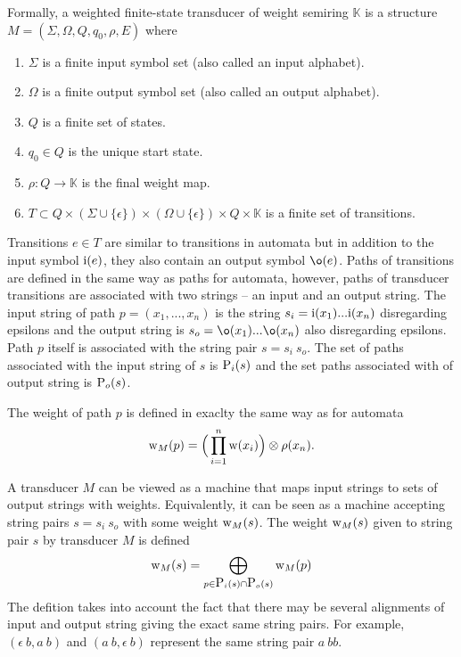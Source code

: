 Formally, a weighted finite-state transducer of weight semiring
$\mathbb{K}$ is a structure $M = (\Sigma, \Omega, Q, q_0, \rho, E)$ where
\begin{enumerate}
\item $\Sigma$ is a finite input symbol set (also called an input alphabet).
\item $\Omega$ is a finite output symbol set (also called an output alphabet).
\item $Q$ is a finite set of states.
\item $q_0 \in Q$ is the unique start state.
\item $\rho: Q \rightarrow \mathbb{K}$ is the final weight map.
\item $T \subset Q \times (\Sigma \cup \{\epsilon\}) \times (\Omega \cup \{\epsilon\}) \times Q \times
\mathbb{K} $ is a finite set of transitions.
\end{enumerate}

Transitions $e \in T$ are similar to transitions in automata but in
addition to the input symbol $\i(e)$, they also contain an output
symbol $\o(e)$. Paths of transitions are defined in the same way as
paths for automata, however, paths of transducer transitions are
associated with two strings -- an input and an output string. The
input string of path $p = (x_1, ..., x_n)$ is the string $s_i =
\i(x_1) ... \i(x_n)$ disregarding epsilons and the output string is
$s_o = \o(x_1) ... \o(x_n)$ also disregarding epsilons. Path $p$
itself is associated with the string pair $s = s_i \: s_o$. The set of
paths associated with the input string of $s$ is $\P_i(s)$ and the set
paths associated with of output string is $\P_o(s)$.

The weight of path $p$ is defined in exaclty the same way as for
automata 
$$\w_M(p) = \Big( \prod_{i = 1}^n \w(x_i) \Big) \otimes \rho(x_n).$$

A transducer $M$ can be viewed as a machine that maps input strings to
sets of output strings with weights. Equivalently, it can be seen as a
machine accepting string pairs $s = s_i \: s_o$ with some weight $\w_M(s)$. The
weight $\w_M(s)$ given to string pair $s$ by transducer $M$ is defined 
$$\w_M(s) = \bigoplus_{p \in \P_i(s) \cap \P_o(s)} \w_M(p)$$
The defition takes into account the fact that there may be several
alignments of input and output string giving the exact same string
pairs. For example, $(\epsilon\:b, a\:b)$ and $(a\:b,\epsilon\:b)$
represent the same string pair $a\:bb$.
